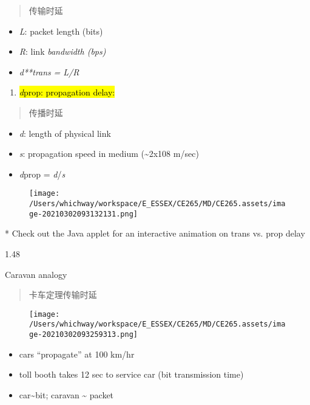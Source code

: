 \documentclass[
]{article}
\begin{document}
\begin{quote}
传输时延
\end{quote}

\begin{itemize}
\item
  \emph{L}: packet length (bits)
\item
  \emph{R}: link \emph{bandwidth (bps)}
\item
  \emph{d**trans} \emph{= L/R}
\end{itemize}

\begin{enumerate}
\def\labelenumi{\arabic{enumi}.}
\item
  \hl{\emph{d}prop: propagation delay:}
\end{enumerate}

\begin{quote}
传播时延
\end{quote}

\begin{itemize}
\item
  \emph{d}: length of physical link
\item
  \emph{s}: propagation speed in medium (\textasciitilde2x108 m/sec)
\item
  \emph{d}prop = \emph{d}/\emph{s}
\end{itemize}

\begin{figure}
\centering
\texttt{[image: /Users/whichway/workspace/E\_ESSEX/CE265/MD/CE265.assets/image-20210302093132131.png]}
\caption{}
\end{figure}

* Check out the Java applet for an interactive animation on trans vs.
prop delay

1.48

Caravan analogy

\begin{quote}
卡车定理传输时延
\end{quote}

\begin{figure}
\centering
\texttt{[image: /Users/whichway/workspace/E\_ESSEX/CE265/MD/CE265.assets/image-20210302093259313.png]}
\caption{}
\end{figure}

\begin{itemize}
\item
  cars ``propagate'' at 100 km/hr
\item
  toll booth takes 12 sec to service car (bit transmission time)
\item
  car\textasciitilde bit; caravan \textasciitilde{} packet
\end{itemize}
\end{document}

